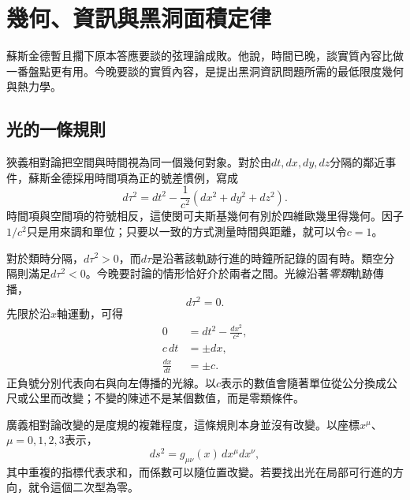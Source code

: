 \chapter{幾何、資訊與黑洞面積定律}


蘇斯金德暫且擱下原本答應要談的弦理論成敗。他說，時間已晚，談實質內容比做一番盤點更有用。今晚要談的實質內容，是提出黑洞資訊問題所需的最低限度幾何與熱力學。

\section{光的一條規則}

狹義相對論把空間與時間視為同一個幾何對象。對於由\(dt,dx,dy,dz\)分隔的鄰近事件，蘇斯金德採用時間項為正的號差慣例，寫成
\begin{equation}
d\tau^2=dt^2-\frac{1}{c^2}\left(dx^2+dy^2+dz^2\right).
\end{equation}
時間項與空間項的符號相反，這使閔可夫斯基幾何有別於四維歐幾里得幾何。因子\(1/c^2\)只是用來調和單位；只要以一致的方式測量時間與距離，就可以令\(c=1\)。

對於類時分隔，\(d\tau^2>0\)，而\(d\tau\)是沿著該軌跡行進的時鐘所記錄的固有時。類空分隔則滿足\(d\tau^2<0\)。今晚要討論的情形恰好介於兩者之間。光線沿著\emph{零類}軌跡傳播，
\begin{equation}
d\tau^2=0.
\end{equation}
先限於沿\(x\)軸運動，可得
\begin{align}
0&=dt^2-\frac{dx^2}{c^2},\\
c\,dt&=\pm dx,\\
\frac{dx}{dt}&=\pm c.
\end{align}
正負號分別代表向右與向左傳播的光線。以\(c\)表示的數值會隨著單位從公分換成公尺或公里而改變；不變的陳述不是某個數值，而是零類條件。

廣義相對論改變的是度規的複雜程度，這條規則本身並沒有改變。以座標\(x^\mu\)、\(\mu=0,1,2,3\)表示，
\begin{equation}
ds^2=g_{\mu\nu}(x)\,dx^\mu dx^\nu,
\end{equation}
其中重複的指標代表求和，而係數可以隨位置改變。若要找出光在局部可行進的方向，就令這個二次型為零。

